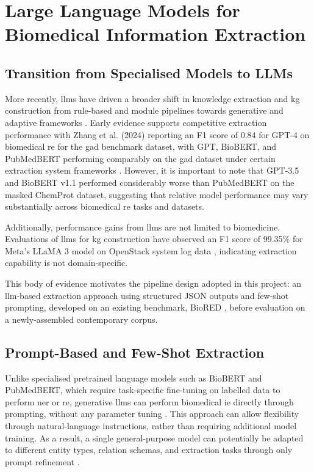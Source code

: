 \section{Large Language Models for Biomedical Information Extraction}
\label{sec:lit:llms_for_biomedical_ie}

\subsection{Transition from Specialised Models to LLMs}
\label{subsec:lit:transition_to_llms}
More recently, \glspl{llm} have driven a broader shift in knowledge extraction and \gls{kg} construction from rule-based and module pipelines towards generative and adaptive frameworks \cite{bian2025_llm_automation_shift}. Early evidence supports competitive extraction performance with Zhang et al. (2024) reporting an F1 score of 0.84 for GPT-4 on biomedical \gls{re} for the \gls{gad} benchmark dataset, with GPT, BioBERT, and PubMedBERT performing comparably on the \gls{gad} dataset under certain extraction system frameworks \cite{zhang2024study}. However, it is important to note that GPT-3.5 and BioBERT v1.1 performed considerably worse than PubMedBERT on the masked ChemProt dataset, suggesting that relative model performance may vary substantially across biomedical \gls{re} tasks and datasets.

Additionally, performance gains from \glspl{llm} are not limited to biomedicine. Evaluations of \glspl{llm} for \gls{kg} construction have observed an F1 score of 99.35\% for Meta's LLaMA 3 model on OpenStack system log data \cite{martin2026_llm_performance}, indicating extraction capability is not domain-specific.

This body of evidence motivates the pipeline design adopted in this project: an \gls{llm}-based extraction approach using structured JSON outputs and few-shot prompting, developed on an existing benchmark, BioRED \cite{luo2022_biored}, before evaluation on a newly-assembled contemporary corpus.

\subsection{Prompt-Based and Few-Shot Extraction}
\label{subsec:lit:prompt_based_and_fs_extraction}
Unlike specialised pretrained language models such as BioBERT and PubMedBERT, which require task-specific fine-tuning on labelled data to perform \gls{ner} or \gls{re}, generative \glspl{llm} can perform biomedical \gls{ie} directly through prompting, without any parameter tuning \cite{brown2020llm_fewshot_learners}. This approach can allow flexibility through natural-language instructions, rather than requiring additional model training. As a result, a single general-purpose model can potentially be adapted to different entity types, relation schemas, and extraction tasks through only prompt refinement \pref.


